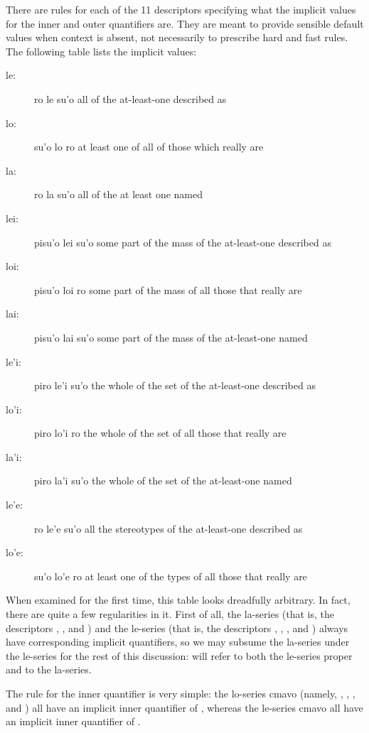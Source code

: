 There are rules for each of the 11 descriptors specifying what
    the implicit values for the inner and outer quantifiers are.
    They are meant to provide sensible default values when context
    is absent, not necessarily to prescribe hard and fast rules.
    The following table lists the implicit values: 
\begin{description}
\item[le:] ro le su'o all of the at-least-one described as
\item[lo:] su'o lo ro at least one of all of those which really are
\item[la:] ro la su'o all of the at least one named
\item[lei:] pisu'o lei su'o some part of the mass of the at-least-one described as
\item[loi:] pisu'o loi ro some part of the mass of all those that really are
\item[lai:] pisu'o lai su'o some part of the mass of the at-least-one named
\item[le'i:] piro le'i su'o the whole of the set of the at-least-one described as
\item[lo'i:] piro lo'i ro the whole of the set of all those that really are
\item[la'i:] piro la'i su'o the whole of the set of the at-least-one named
\item[le'e:] ro le'e su'o all the stereotypes of the at-least-one described as
\item[lo'e:] su'o lo'e ro at least one of the types of all those that really are
\end{description}

When examined for the first time, this table looks dreadfully
    arbitrary. In fact, there are quite a few regularities in it.
    First of all, the la-series (that is, the descriptors ,
    , and ) and the le-series (that is, the
    descriptors , , , and ) always
    have corresponding implicit quantifiers, so we may subsume the
    la-series under the le-series for the rest of this discussion:
     will refer to both the le-series proper and
    to the la-series. 

The rule for the inner quantifier is very simple: the
    lo-series cmavo (namely, , , , and
    ) all have an implicit inner quantifier of ,
    whereas the le-series cmavo all have an implicit inner
    quantifier of .

